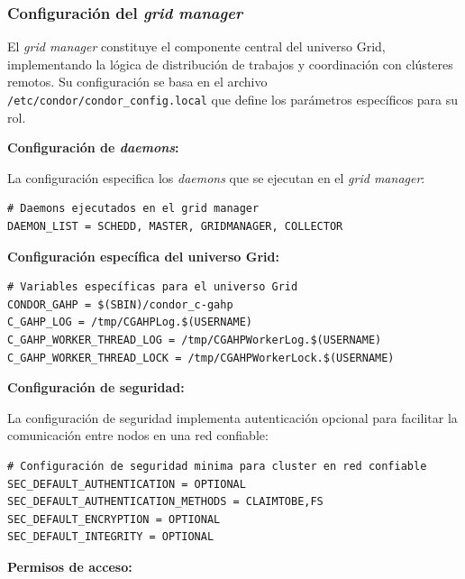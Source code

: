 \FloatBarrier\subsubsection{Configuración del \textit{grid manager}}

El \textit{grid manager} constituye el componente central del universo Grid, implementando la lógica de distribución de trabajos y coordinación con clústeres remotos. Su configuración se basa en el archivo \texttt{/etc/condor/condor\_config.local} que define los parámetros específicos para su rol.

\textbf{Configuración de \textit{daemons}:}

La configuración especifica los \textit{daemons} que se ejecutan en el \textit{grid manager}:

\begin{verbatim}
# Daemons ejecutados en el grid manager
DAEMON_LIST = SCHEDD, MASTER, GRIDMANAGER, COLLECTOR
\end{verbatim}

\textbf{Configuración específica del universo Grid:}

\begin{verbatim}
# Variables específicas para el universo Grid
CONDOR_GAHP = $(SBIN)/condor_c-gahp
C_GAHP_LOG = /tmp/CGAHPLog.$(USERNAME)
C_GAHP_WORKER_THREAD_LOG = /tmp/CGAHPWorkerLog.$(USERNAME)
C_GAHP_WORKER_THREAD_LOCK = /tmp/CGAHPWorkerLock.$(USERNAME)
\end{verbatim}

\textbf{Configuración de seguridad:}

La configuración de seguridad implementa autenticación opcional para facilitar la comunicación entre nodos en una red confiable:

\begin{verbatim}
# Configuración de seguridad minima para cluster en red confiable
SEC_DEFAULT_AUTHENTICATION = OPTIONAL
SEC_DEFAULT_AUTHENTICATION_METHODS = CLAIMTOBE,FS
SEC_DEFAULT_ENCRYPTION = OPTIONAL
SEC_DEFAULT_INTEGRITY = OPTIONAL
\end{verbatim}

\textbf{Permisos de acceso:}

